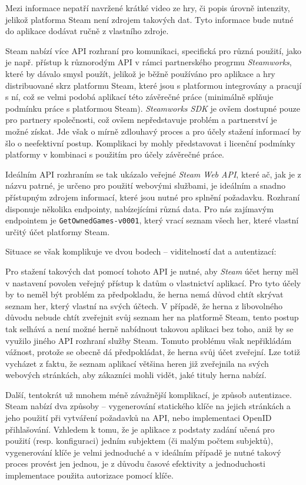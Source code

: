 Mezi informace nepatří navržené krátké video ze hry, či popis úrovně
intenzity, jelikož platforma Steam není zdrojem takových dat. Tyto
informace bude nutné do aplikace dodávat ručně z vlastního zdroje.

Steam nabízí více API rozhraní pro komunikaci, specifická pro různá
použití, jako je např. přístup k různorodým API v rámci partnerského
progrmu \emph{Steamworks}, které by dávalo smysl použít, jelikož je
běžně používáno pro aplikace a hry distribuované skrz platformu Steam,
které jsou s platformou integrovány a pracují s ní, což se velmi podobá
aplikací této závěrečné práce (minimálně splňuje podmínku práce s
platformou Steam). \emph{Steamworks SDK} je ovšem dostupné pouze pro
partnery společnosti, což ovšem nepředstavuje problém a partnerství je možné získat.
Jde však o mírně zdlouhavý proces a pro účely stažení informací by šlo o
neefektivní postup. Komplikaci by mohly představovat i licenční podmínky
platformy v kombinaci s použitím pro účely závěrečné práce.

Ideálním API rozhraním se tak ukázalo veřejné \emph{Steam Web API},
které ač, jak je z názvu patrné, je určeno pro použití webovými
službami, je ideálním a snadno přístupným zdrojem informací, které jsou
nutné pro splnění požadavku. Rozhraní disponuje několika endpointy,
nabízejícími různá data. Pro nás zajímavým endpointem je
\texttt{GetOwnedGames-v0001}, který vrací seznam všech her, které
vlastní určitý účet platformy Steam.

Situace se však komplikuje ve dvou bodech -- viditelností dat a
autentizací:

Pro stažení takových dat pomocí tohoto API je nutné, aby \emph{Steam} 
účet herny měl v nastavení povolen veřejný přístup k
datům o vlastnictví aplikací. Pro tyto účely by to neměl být problém za
předpokladu, že herna nemá důvod chtít skrývat seznam her, který vlastní
na svých účtech. V případě, že herna z libovolného důvodu nebude chtít
zveřejnit svůj seznam her na platformě Steam, tento postup tak selhává a
není možné herně nabídnout takovou aplikaci bez toho, aniž by se využilo
jiného API rozhraní služby Steam. Tomuto problému však nepřikládám
vážnost, protože se obecně dá předpokládat, že herna svůj účet zveřejní.
Lze totiž vycházet z faktu, že seznam aplikací většina heren již zveřejnila
na svých webových stránkách, aby zákazníci mohli vidět, jaké tituly
herna nabízí.

Další, tentokrát už mnohem méně závažnější komplikací, je způsob
autentizace. Steam nabízí dva způsoby
-- vygenerování statického klíče na jejich stránkách a jeho použití
při vytváření požadavků na API, nebo implementaci OpenID přihlašování.
Vzhledem k tomu, že je aplikace z podstaty zadání učená pro použití
(resp. konfiguraci) jedním subjektem (či malým počtem subjektů),
vygenerování klíče je velmi jednoduché a v ideálním případě je nutné
takový proces provést jen jednou, je z důvodu časové efektivity a 
jednoduchosti implementace použita autorizace pomocí klíče.

